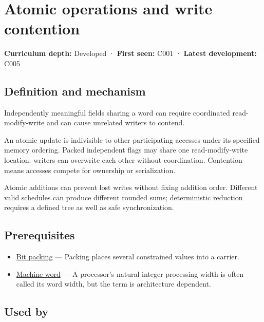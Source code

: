 \hypertarget{appendix-e12d1b03fefb}{}\label{referencestart:appendix-e12d1b03fefb}
\section{Atomic operations and write contention}\label{appendix-e12d1b03fefb-atomic-operations-and-write-contention}

\textbf{Curriculum depth:} Developed · \textbf{First seen:} C001 · \textbf{Latest development:} C005

\subsection{Definition and mechanism}\label{appendix-e12d1b03fefb-definition-and-mechanism}

Independently meaningful fields sharing a word can require coordinated read-modify-write and can cause unrelated writers to contend.

An atomic update is indivisible to other participating accesses under its specified memory ordering. Packed independent flags may share one read-modify-write location: writers can overwrite each other without coordination. Contention means accesses compete for ownership or serialization.

Atomic additions can prevent lost writes without fixing addition order. Different valid schedules can produce different rounded sums; deterministic reduction requires a defined tree as well as safe synchronization.

\subsection{Prerequisites}\label{appendix-e12d1b03fefb-prerequisites}

\begin{itemize}
\tightlist
\item
  \hyperref[appendix-1f9963e1a5d1]{Bit packing} --- Packing places several constrained values into a carrier.
\item
  \hyperref[appendix-d67a19507dc5]{Machine word} --- A processor's natural integer processing width is often called its word width, but the term is architecture dependent.
\end{itemize}

\subsection{Used by}\label{appendix-e12d1b03fefb-used-by}

